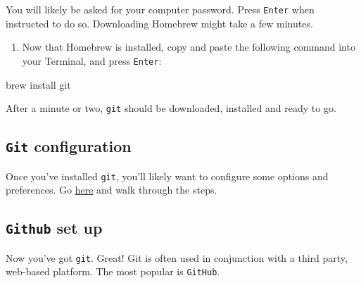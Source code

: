 \documentclass[
]{book}
\newenvironment{Shaded}{\begin{snugshade}}{\end{snugshade}}
\newcommand{\NormalTok}[1]{#1}
\newcommand{\OperatorTok}[1]{\textcolor[rgb]{0.81,0.36,0.00}{\textbf{#1}}}
\newcommand{\StringTok}[1]{\textcolor[rgb]{0.31,0.60,0.02}{#1}}
\providecommand{\tightlist}{%
  \setlength{\itemsep}{0pt}\setlength{\parskip}{0pt}}
\begin{document}
\begin{Shaded}
\end{Shaded}

You will likely be asked for your computer password. Press \texttt{Enter} when instructed to do so. Downloading Homebrew might take a few minutes.

\begin{enumerate}
\def\labelenumi{\arabic{enumi}.}
\setcounter{enumi}{2}
\tightlist
\item
  Now that Homebrew is installed, copy and paste the following command into your Terminal, and press \texttt{Enter}:
\end{enumerate}

\begin{Shaded}
\begin{Highlighting}[]
\NormalTok{brew install git}
\end{Highlighting}
\end{Shaded}

After a minute or two, \texttt{git} should be downloaded, installed and ready to go.

\hypertarget{git-configuration}{%
\subsection*{\texorpdfstring{\texttt{Git} configuration}{Git configuration}}\label{git-configuration}}

Once you've installed \texttt{git}, you'll likely want to configure some options and preferences. Go \href{https://git-scm.com/book/en/v2/Getting-Started-First-Time-Git-Setup}{here} and walk through the steps.

\hypertarget{github-set-up}{%
\subsection*{\texorpdfstring{\texttt{Github} set up}{Github set up}}\label{github-set-up}}

Now you've got \texttt{git}. Great! Git is often used in conjunction with a third party, web-based platform. The most popular is \texttt{GitHub}.
\end{document}
